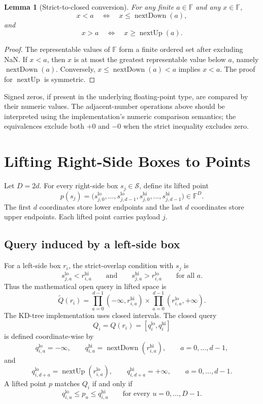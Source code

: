 \documentclass[11pt]{article}
\theoremstyle{definition}
\theoremstyle{plain}
\newtheorem{lemma}{Lemma}[section]
\theoremstyle{remark}
\DeclareMathOperator{\nextUp}{nextUp}
\DeclareMathOperator{\nextDown}{nextDown}
\newcommand{\Srel}{\mathcal S}
\newcommand{\F}{\mathbb F}
\newcommand{\lo}{\mathrm{lo}}
\newcommand{\hi}{\mathrm{hi}}
\begin{document}
\begin{lemma}[Strict-to-closed conversion]
For any finite $a\in\F$ and any $x\in\F$,
\[
  x<a \quad\Longleftrightarrow\quad x\le \nextDown(a),
\]
and
\[
  x>a \quad\Longleftrightarrow\quad x\ge \nextUp(a).
\]
\end{lemma}

\begin{proof}
The representable values of $\F$ form a finite ordered set after excluding NaN.  If
$x<a$, then $x$ is at most the greatest representable value below $a$, namely
$\nextDown(a)$.  Conversely, $x\le\nextDown(a)<a$ implies $x<a$.  The proof for
$\nextUp$ is symmetric.
\end{proof}

Signed zeros, if present in the underlying floating-point type, are compared by their
numeric values.  The adjacent-number operations above should be interpreted using the
implementation's numeric comparison semantics; the equivalences exclude both $+0$ and $-0$
when the strict inequality excludes zero.

\section{Lifting Right-Side Boxes to Points}

Let $D=2d$.  For every right-side box $s_j\in\Srel$, define its lifted point
\[
  p(s_j)
  = \bigl(
      s_{j,0}^{\lo},\ldots,s_{j,d-1}^{\lo},
      s_{j,0}^{\hi},\ldots,s_{j,d-1}^{\hi}
    \bigr) \in \F^{D}.
\]
The first $d$ coordinates store lower endpoints and the last $d$ coordinates store upper
endpoints.  Each lifted point carries payload $j$.

\subsection{Query induced by a left-side box}

For a left-side box $r_i$, the strict-overlap condition with $s_j$ is
\[
  s_{j,a}^{\lo}<r_{i,a}^{\hi}
  \qquad\text{and}\qquad
  s_{j,a}^{\hi}>r_{i,a}^{\lo}
  \qquad\text{for all }a.
\]
Thus the mathematical open query in lifted space is
\[
  \widetilde Q(r_i)
  = \prod_{a=0}^{d-1}(-\infty,r_{i,a}^{\hi})
    \times
    \prod_{a=0}^{d-1}(r_{i,a}^{\lo},+\infty).
\]
The KD-tree implementation uses closed intervals.  The closed query
\[
  Q_i = Q(r_i) = [q_i^{\lo},q_i^{\hi}]
\]
is defined coordinate-wise by
\[
  q_{i,a}^{\lo}=-\infty,
  \qquad
  q_{i,a}^{\hi}=\nextDown(r_{i,a}^{\hi}),
  \qquad a=0,\ldots,d-1,
\]
and
\[
  q_{i,d+a}^{\lo}=\nextUp(r_{i,a}^{\lo}),
  \qquad
  q_{i,d+a}^{\hi}=+\infty,
  \qquad a=0,\ldots,d-1.
\]
A lifted point $p$ matches $Q_i$ if and only if
\[
  q_{i,u}^{\lo}\le p_u\le q_{i,u}^{\hi}
  \qquad\text{for every }u=0,\ldots,D-1.
\]
\end{document}
